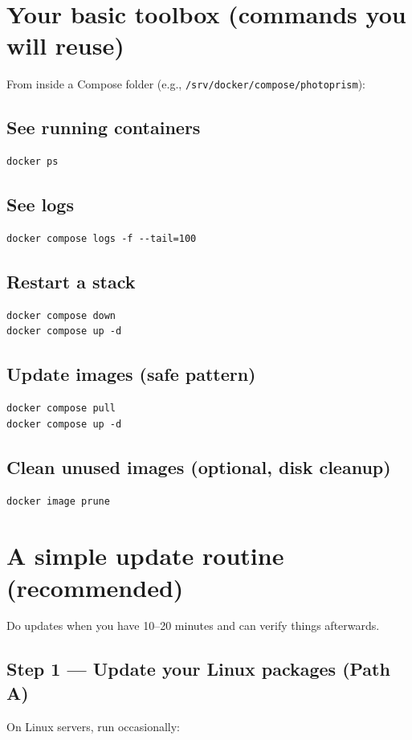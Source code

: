 \section{Your basic toolbox (commands you will reuse)}
From inside a Compose folder (e.g., \texttt{/srv/docker/compose/photoprism}):

\subsection*{See running containers}
\begin{lstlisting}
docker ps
\end{lstlisting}

\subsection*{See logs}
\begin{lstlisting}
docker compose logs -f --tail=100
\end{lstlisting}

\subsection*{Restart a stack}
\begin{lstlisting}
docker compose down
docker compose up -d
\end{lstlisting}

\subsection*{Update images (safe pattern)}
\begin{lstlisting}
docker compose pull
docker compose up -d
\end{lstlisting}

\subsection*{Clean unused images (optional, disk cleanup)}
\begin{lstlisting}
docker image prune
\end{lstlisting}

\section{A simple update routine (recommended)}
Do updates when you have 10--20 minutes and can verify things afterwards.

\subsection{Step 1 --- Update your Linux packages (Path A)}
On Linux servers, run occasionally:

